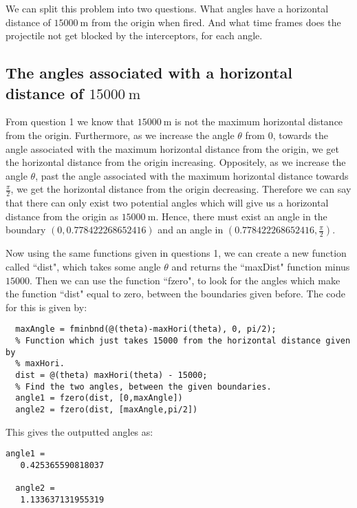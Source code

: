 \documentclass[12pt]{article}
\begin{document}
We can split this problem into two questions. What angles have a horizontal distance of $\SI{15000}{\meter}$ from the origin when fired. And what time frames does the projectile not get blocked by the interceptors, for each angle.

\subsection{The angles associated with a horizontal distance of $\SI{15000}{\meter}$}
From question 1 we know that $\SI{15000}{\meter}$ is not the maximum horizontal distance from the origin. Furthermore, as we increase the angle $\theta$ from 0, towards the angle associated with the maximum horizontal distance from the origin, we get the horizontal distance from the origin increasing. Oppositely, as we increase the angle $\theta$, past the angle associated with the maximum horizontal distance towards $\frac{\pi}{2}$, we get the horizontal distance from the origin decreasing. Therefore we can say that there can only exist two potential angles which will give us a horizontal distance from the origin as $\SI{15000}{\meter}$. Hence, there must exist an angle in the boundary $(0, 0.778422268652416)$ and an angle in $(0.778422268652416, \frac{\pi}{2})$.

Now using the same functions given in questions 1, we can create a new function called ``dist", which takes some angle $\theta$ and returns the ``maxDist" function minus $15000$. Then we can use the function ``fzero", to look for the angles which make the function ``dist" equal to zero, between the boundaries given before. The code for this is given by:
\begin{lstlisting}[title={Main code for finding potential angles}]
  % Find the exact angle associated with the max horizontal distance.
  maxAngle = fminbnd(@(theta)-maxHori(theta), 0, pi/2);
  % Function which just takes 15000 from the horizontal distance given by
  % maxHori.
  dist = @(theta) maxHori(theta) - 15000;
  % Find the two angles, between the given boundaries.
  angle1 = fzero(dist, [0,maxAngle])
  angle2 = fzero(dist, [maxAngle,pi/2])
\end{lstlisting}
This gives the outputted angles as:
\begin{lstlisting}[title={Output for potential angles}]
  angle1 =
   0.425365590818037

  angle2 =
   1.133637131955319
\end{lstlisting}
\end{document}
